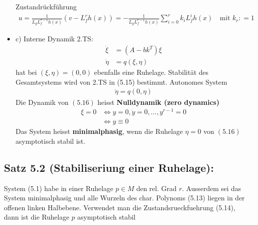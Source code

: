 \documentclass[ngerman]{tudscrreprt}
\begin{document}
\begin{itemize}
Zustandrückführung \begin{align*}
u = \frac{1}{L_g L_f^{r-1} h(x)} (v- L_f^r h(x)) = -\frac{1}{L_g L_f^{r-1} h(x)} \sum\limits_{i=0}^r k_i L_f^i h(x) \quad \text{mit } k_r: =1\tag{5.14}
\end{align*}
\item c) Interne Dynamik 2.TS: \begin{align*}
\dot \xi &= (A - bk^T)\xi\\ 
\dot \eta &= q(\xi,\eta) \tag{5.15}
\end{align*}
hat bei $(\xi, \eta) = (0,0) $ ebenfalls eine Ruhelage. Stabilität des Gesamtsystems wird von 2.TS in (5.15) bestimmt. Autonomes System \begin{align*} \dot \eta  = q(0, \eta) \tag{5.16} \end{align*} 
Die Dynamik von $(5.16)$ heisst \textbf{Nulldynamik (zero dynamics)} \begin{align*}
\xi = 0 &\iff y= 0, \dot y= 0,\dots, y^{r-1} =0\\ &\iff y\equiv 0
\end{align*}  
Das System heisst \textbf{minimalphasig}, wenn die Ruhelage $\eta = 0$ von $(5.16)$ asymptotisch stabil ist.
\end{itemize}
\subsection*{Satz 5.2 (Stabiliseriung einer Ruhelage):}System (5.1) habe in einer Ruhelage $p\in M$ den rel. Grad $r$. Ausserdem sei das System minimalphasig und alle Wurzeln des char. Polynoms (5.13) liegen in der offenen linken Halbebene. Verwendet man die Zustandsrueckfuehrung (5.14), dann ist die Ruhelage $p$ asymptotisch stabil
\end{document}
